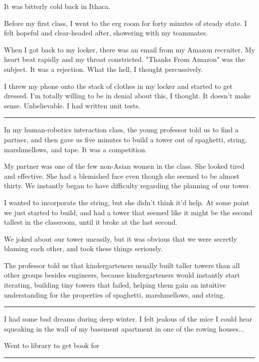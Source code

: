 It was bitterly cold back in Ithaca.

Before my first class, I went to the erg room for forty minutes of steady state.
I felt hopeful and clear-headed after, showering with my teammates.

When I got back to my locker, there was an email from my Amazon recruiter.  My
heart beat rapidly and my throat constricted.  "Thanks From Amazon" was the
subject.  It was a rejection.  What the hell, I thought percussively. 

I threw my phone onto the stack of clothes in my locker and started to get
dressed.  I'm totally willing to be in denial about this, I thought.  It doesn't
make sense.  Unbelievable.  I had written unit tests.

\plainfancybreak{12pt}{2}{* * *}

In my human-robotics interaction class, the young professor told us to find a
partner, and then gave us five minutes to build a tower out of spaghetti,
string, marshmellows, and tape.  It was a competition.

My partner was one of the few non-Asian women in the class.  She looked tired
and effective.  She had a blemished face even though she seemed to be almost
thirty.  We instantly began to have difficulty regarding the planning of our
tower.  

I wanted to incorporate the string, but she didn't think it'd help.  At some
point we just started to build, and had a tower that seemed like it might be the
second tallest in the classroom, until it broke at the last second.

We joked about our tower uneasily, but it was obvious that we were secretly
blaming each other, and took these things seriously.

The professor told us that kindergarteners usually built taller towers than all
other groups besides engineers, because kindergarteners would instantly start
iterating, building tiny towers that failed, helping them gain an intuitive
understanding for the properties of spaghetti, marshmellows, and string. 

\plainfancybreak{12pt}{2}{* * *}

I had some bad dreams during deep winter.  I felt jealous of the mice I could
hear squeaking in the wall of my basement apartment in one of the rowing
houses...

Went to library to get book for 

\plainfancybreak{12pt}{2}{* * *}

